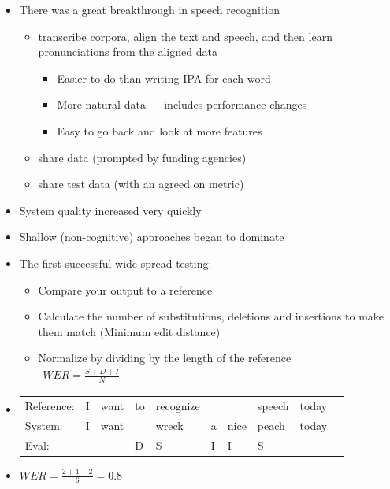 \documentclass[a4paper,landscape,headrule,footrule,xetex]{foils}
\begin{document}

\begin{itemize}
\item There was a great breakthrough in speech recognition
  \begin{itemize}
  \item transcribe corpora, align the text and speech,
    and then learn pronunciations from the aligned data
    \begin{itemize}
    \item Easier to do than writing IPA for each word
    \item More natural data --- includes performance changes
    \item Easy to go back and look at more features
    \end{itemize}
  \item share data (prompted by funding agencies)
  \item share test data (with an agreed on metric)
  \end{itemize}
\item System quality increased very quickly
\item Shallow (non-cognitive) approaches began to dominate
\end{itemize}



\begin{itemize}
\item The first successful wide spread testing:
  \begin{itemize}
  \item Compare your output to a reference
  \item Calculate the number of substitutions, deletions and insertions to make them match
(Minimum edit distance)
  \item Normalize by dividing by the length of the reference\\[2ex]
    {\Large
    $\begin{array}{lcr}
      WER = \frac{S+D+I}{N}
    \end{array}$
}
  \end{itemize}

\item 
  \begin{tabular}[t]{llllllllll}
    Reference: & I &want &to &recognize&  & &speech & today \\
    System:    & I &want &   &wreck    &a &nice &peach & today\\
    Eval:      &   &     & D   & S       & I & I & S \\
  \end{tabular}
\item $WER=\frac{2+1+2}{6}=0.8$

\end{itemize}
\end{document}
